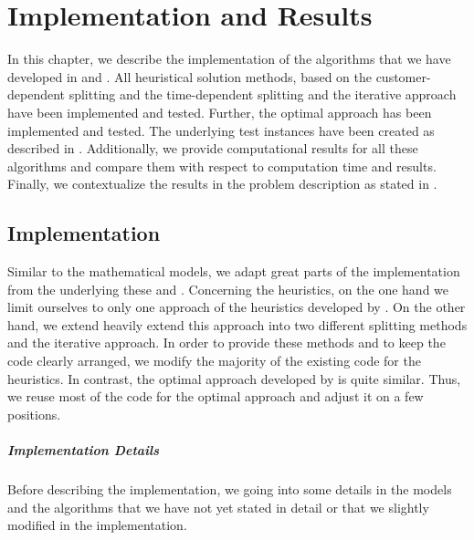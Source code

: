 \chapter{Implementation and Results}
\label{ch:implementation_results}

In this chapter, we describe the implementation of the algorithms that we have developed in  and . All heuristical solution methods, based on the customer-dependent splitting and the time-dependent splitting and the iterative approach have been implemented and tested. Further, the optimal approach has been implemented and tested. The underlying test instances have been created as described in . Additionally, we provide computational results for all these algorithms and compare them with respect to computation time and results. Finally, we contextualize the results in the problem description as stated in .


\section{Implementation}
\label{sec:implementation}

Similar to the mathematical models, we adapt great parts of the implementation from the underlying these \cite{Kaiser} and \cite{Knoll}. Concerning the heuristics, on the one hand we limit ourselves to only one approach of the heuristics developed by \cite{Knoll}. On the other hand, we extend heavily extend this approach into two different splitting methods and the iterative approach. In order to provide these methods and to keep the code clearly arranged, we modify the majority of the existing code for the heuristics. In contrast, the optimal approach developed by \cite{Kaiser} is quite similar. Thus, we reuse most of the code for the optimal approach and adjust it on a few positions. 

\paragraph{Implementation Details} \parfill

Before describing the implementation, we going into some details in the models and the algorithms that we have not yet stated in detail or that we slightly modified in the implementation.


